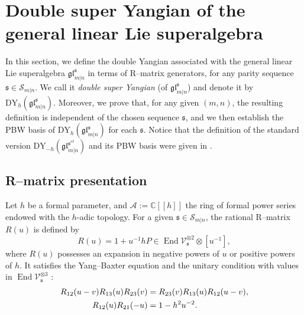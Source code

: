 \documentclass[a4paper,12pt]{article}
\numberwithin{equation}{section}
\begin{document}
\section{Double super Yangian of the general linear Lie superalgebra}
 
In this section, we define the double Yangian associated with the general linear Lie superalgebra $\mathfrak{gl}^{\mathfrak{s}}_{m|n}$ in terms of R--matrix generators, for any parity sequence $\mathfrak{s}\in\mathcal{S}_{m|n}$. We call it \textit{double super Yangian} (of $\mathfrak{gl}^{\mathfrak{s}}_{m|n}$) and denote it by $\mathrm{DY}_{h}(\mathfrak{gl}_{m|n}^{\mathfrak{s}})$. Moreover, we prove that, for any given $(m,n)$, the resulting definition is independent of the chosen sequence $\mathfrak{s}$, and we then establish the PBW basis of $\mathrm{DY}_{h}(\mathfrak{gl}_{m|n}^{\mathfrak{s}})$ for each $\mathfrak{s}$. Notice that the definition of the standard version $\mathrm{DY}_{-h}(\mathfrak{gl}_{m|n}^{\mathfrak{s}^{st}})$ and its PBW basis were given in \cite{BK25-1, BK25-2}. 



\subsection{R--matrix presentation}

Let $h$ be a formal parameter, and $\mathcal{A}:=\mathbb{C}[[h]]$ the ring of formal power series endowed with the $h$-adic topology. For a given $\mathfrak{s}\in\mathcal{S}_{m|n}$, the rational R--matrix $R(u)$ is defined by
\begin{equation}\label{R-matrix}
R(u)=1+u^{-1}hP\in \operatorname{End} \mathcal{V}_{\mathfrak{s}}^{\otimes 2}\otimes[u^{-1}],
\end{equation}
where $R(u)$ possesses an expansion in negative powers of $u$ or positive powers of $h$. It satisfies the Yang–Baxter equation and the unitary condition with values in $\operatorname{End} \mathcal{V}_{\mathfrak{s}}^{\otimes3}$ :
\begin{align}\notag
R_{12}(u-v)R_{13}(u)R_{23}(v)&=R_{23}(v)R_{13}(u)R_{12}(u-v),\\ \label{R12R21}
R_{12}(u)R_{21}(-u)&=1-h^{2}u^{-2}.
\end{align}
\end{document}
